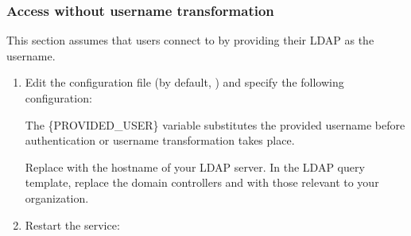 \documentclass[letterpaper,10pt,english]{sphinxmanual}
\begin{document}
\subsubsection{Access without username transformation}
\label{\detokenize{ldap-setup:access-without-username-transformation}}
\sphinxAtStartPar
This section assumes that users connect to  by providing their LDAP  as the username.
\begin{enumerate}
%
\item {} 
\sphinxAtStartPar
Edit the  configuration file (by default, ) and specify the following configuration:

\begin{sphinxVerbatim}[commandchars=\\\{\}]

\end{sphinxVerbatim}

\sphinxAtStartPar
The \{PROVIDED\_USER\} variable substitutes the provided username before authentication or username transformation takes place.

\sphinxAtStartPar
Replace  with the hostname of your LDAP server. In the LDAP query template, replace the domain controllers  and  with those relevant to your organization.

\item {} 
\sphinxAtStartPar
Restart the  service:


\end{enumerate}
\end{document}
